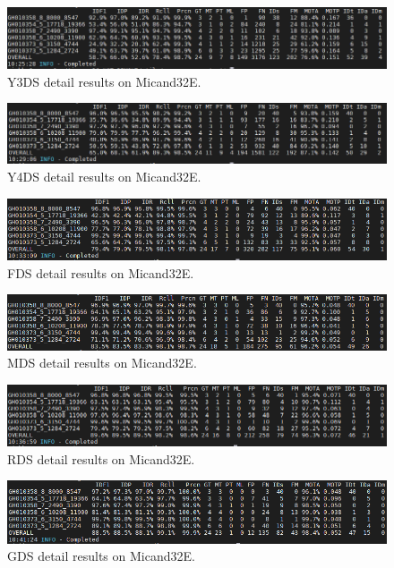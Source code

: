 \begin{figure}
	\centerline{\includegraphics[width=1\linewidth]{Figs/Evaluation/micand6/y3ds.png}}
	\caption{Y3DS detail results on Micand32E.}
\end{figure}
\begin{figure}
	\centerline{\includegraphics[width=1\linewidth]{Figs/Evaluation/micand6/y4ds.png}}
	\caption{Y4DS detail results on Micand32E.}
\end{figure}
\begin{figure}
	\centerline{\includegraphics[width=1\linewidth]{Figs/Evaluation/micand6/fds.png}}
	\caption{FDS detail results on Micand32E.}
\end{figure}
\begin{figure}
	\centerline{\includegraphics[width=1\linewidth]{Figs/Evaluation/micand6/mds.png}}
	\caption{MDS detail results on Micand32E.}
\end{figure}
\begin{figure}
	\centerline{\includegraphics[width=1\linewidth]{Figs/Evaluation/micand6/rds.png}}
	\caption{RDS detail results on Micand32E.}
\end{figure}
\begin{figure}
	\centerline{\includegraphics[width=1\linewidth]{Figs/Evaluation/micand6/gds.png}}
	\caption{GDS detail results on Micand32E.}
	\label{fig:GDS_short}
\end{figure}
